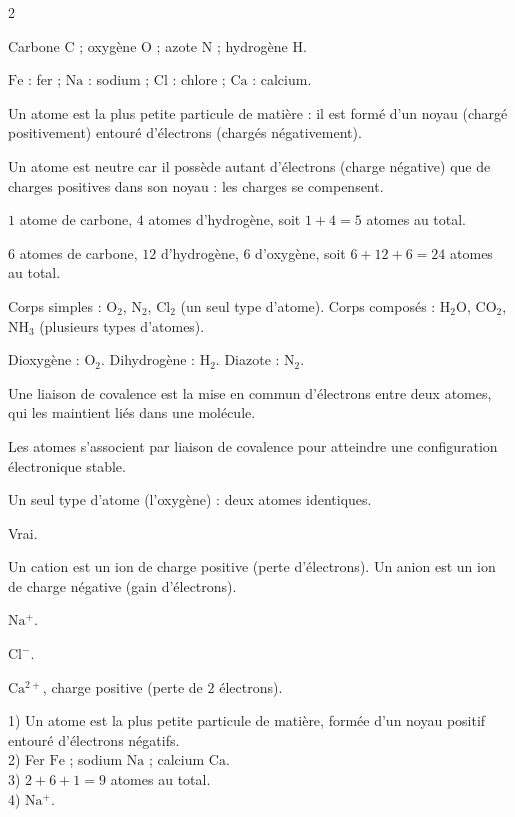 \begin{multicols}{2}

Carbone $\mathrm{C}$ ; oxygène $\mathrm{O}$ ; azote $\mathrm{N}$ ; hydrogène $\mathrm{H}$.

$\mathrm{Fe}$ : fer ; $\mathrm{Na}$ : sodium ; $\mathrm{Cl}$ : chlore ; $\mathrm{Ca}$ :
calcium.

Un atome est la plus petite particule de matière : il est formé d'un noyau (chargé
positivement) entouré d'électrons (chargés négativement).

Un atome est neutre car il possède autant d'électrons (charge négative) que de charges
positives dans son noyau : les charges se compensent.

$1$ atome de carbone, $4$ atomes d'hydrogène, soit $1+4=5$ atomes au total.

$6$ atomes de carbone, $12$ d'hydrogène, $6$ d'oxygène, soit $6+12+6=24$ atomes au total.

Corps simples : $\mathrm{O_2}$, $\mathrm{N_2}$, $\mathrm{Cl_2}$ (un seul type d'atome).
Corps composés : $\mathrm{H_2O}$, $\mathrm{CO_2}$, $\mathrm{NH_3}$ (plusieurs types
d'atomes).

Dioxygène : $\mathrm{O_2}$. Dihydrogène : $\mathrm{H_2}$. Diazote : $\mathrm{N_2}$.

Une liaison de covalence est la mise en commun d'électrons entre deux atomes, qui les
maintient liés dans une molécule.

Les atomes s'associent par liaison de covalence pour atteindre une configuration
électronique stable.

Un seul type d'atome (l'oxygène) : deux atomes identiques.

Vrai.

Un cation est un ion de charge positive (perte d'électrons). Un anion est un ion de charge
négative (gain d'électrons).

$\mathrm{Na^+}$.

$\mathrm{Cl^-}$.

$\mathrm{Ca^{2+}}$, charge positive (perte de $2$ électrons).

1) Un atome est la plus petite particule de matière, formée d'un noyau positif entouré
d'électrons négatifs.\\
2) Fer $\mathrm{Fe}$ ; sodium $\mathrm{Na}$ ; calcium $\mathrm{Ca}$.\\
3) $2+6+1=9$ atomes au total.\\
4) $\mathrm{Na^+}$.


\end{multicols}
